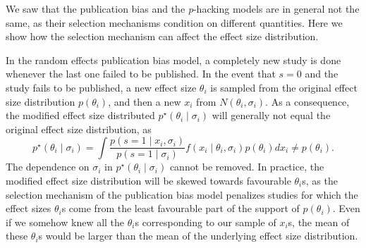 \documentclass[useAMS,usenatbib,referee]{biom}
\begin{document}


We saw that the publication bias and the \textit{p}-hacking models are in general not the same, as their selection mechanisms condition on different quantities. Here we show how the selection mechanism can affect the effect size distribution.

In the random effects publication bias model, a completely new study is done whenever the last one failed to be published. In the event that $s=0$ and the study fails to be published, a new effect size $\theta_i$ is sampled from the original effect size distribution $p(\theta_i)$, and then a new $x_i$ from $N(\theta_i,\sigma_i)$. As a consequence, the modified effect size distributed $p^\star(\theta_i\mid \sigma_i)$ will generally not equal the original effect size distribution, as
\[
p^\star(\theta_i\mid \sigma_i)=\int\frac{p(s=1\mid x_i, \sigma_i)}{p(s=1\mid\sigma_i)}f(x_i \mid \theta_i, \sigma _i) p(\theta_i) dx_i\neq p(\theta_i).
\]
The dependence on $\sigma_i$ in $p^\star(\theta_i\mid \sigma_i)$ cannot be removed. In practice, the modified effect size distribution will be skewed towards favourable $\theta_i$s, as the selection mechanism of the publication bias model penalizes studies for which the effect sizes $\theta_i$s come from the least favourable part of the support of $p(\theta_i)$. Even if we somehow knew all the $\theta_i$s corresponding to our sample of $x_i$s, the mean of these $\theta_i$s would be larger than the mean of the underlying effect size distribution. %

\end{document}
